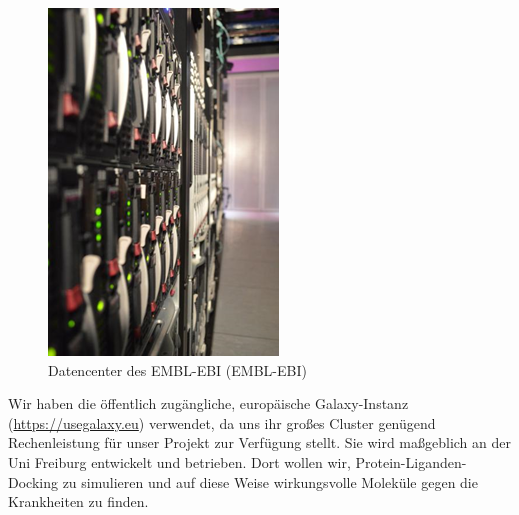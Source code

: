 \documentclass[10pt]{article}
\begin{document}
    \begin{figure}
        \includegraphics[width=\linewidth]{Datacenter}
        \caption{Datencenter des EMBL-EBI (EMBL-EBI)}
    \end{figure}

    Wir haben die öffentlich zugängliche, europäische Galaxy-Instanz (\url{https://usegalaxy.eu}) verwendet, da uns
    ihr großes Cluster genügend Rechenleistung für unser Projekt zur Verfügung stellt.
    Sie wird maßgeblich an der Uni Freiburg entwickelt und betrieben.
    Dort wollen wir, Protein-Liganden-Docking zu simulieren und auf diese
    Weise wirkungsvolle Moleküle gegen die Krankheiten zu finden.
\end{document}
